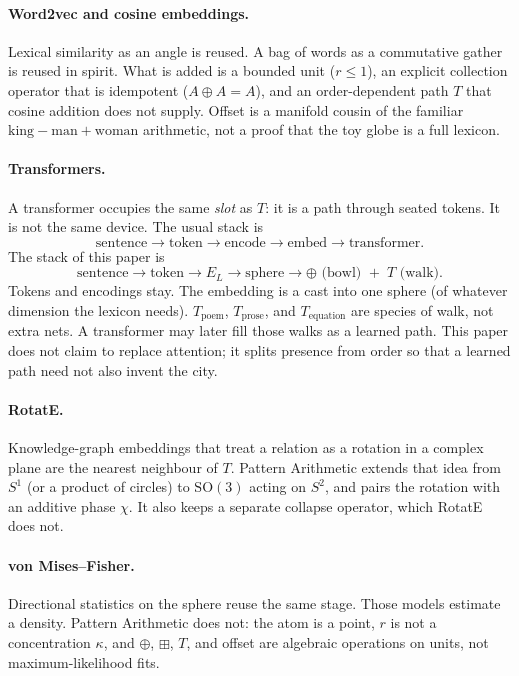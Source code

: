 \documentclass[12pt, a4paper]{article}
\begin{document}
\paragraph{Word2vec and cosine embeddings.}
Lexical similarity as an angle is reused. A bag of words as a
commutative gather is reused in spirit. What is added is a bounded unit
($r\le 1$), an explicit collection operator that is idempotent
($A\oplus A=A$), and an order-dependent path $T$ that cosine addition
does not supply. Offset is a manifold cousin of the familiar
$\mathrm{king}-\mathrm{man}+\mathrm{woman}$ arithmetic, not a proof
that the toy globe is a full lexicon.

\paragraph{Transformers.}
A transformer occupies the same \emph{slot} as $T$: it is a path
through seated tokens. It is not the same device. The usual stack is
\[
\text{sentence}\to\text{token}\to\text{encode}\to\text{embed}\to\text{transformer}.
\]
The stack of this paper is
\[
\text{sentence}\to\text{token}\to E_L\to\text{sphere}\to
\oplus\text{ (bowl) }+\; T\text{ (walk)}.
\]
Tokens and encodings stay. The embedding is a cast into one sphere
(of whatever dimension the lexicon needs). $T_{\mathrm{poem}}$,
$T_{\mathrm{prose}}$, and $T_{\mathrm{equation}}$ are species of
walk, not extra nets. A transformer may later fill those walks as a
learned path. This paper does not claim to replace attention; it
splits presence from order so that a learned path need not also
invent the city.

\paragraph{RotatE.}
Knowledge-graph embeddings that treat a relation as a rotation in a
complex plane are the nearest neighbour of $T$. Pattern Arithmetic
extends that idea from $S^1$ (or a product of circles) to
$\mathrm{SO}(3)$ acting on $S^2$, and pairs the rotation with an
additive phase $\chi$. It also keeps a separate collapse operator,
which RotatE does not.

\paragraph{von Mises--Fisher.}
Directional statistics on the sphere reuse the same stage.
Those models estimate a density. Pattern Arithmetic does not: the atom
is a point, $r$ is not a concentration $\kappa$, and $\oplus$, $\boxplus$, $T$, and
offset are algebraic operations on units, not maximum-likelihood fits.
\end{document}
